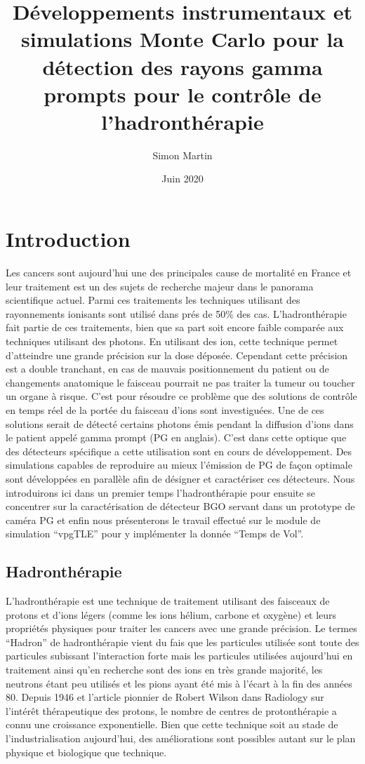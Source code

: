 \documentclass[11pt,a4paper,oldfontcommands]{memoir}
\begin{document}
\title{Développements instrumentaux et simulations Monte Carlo pour la détection des rayons gamma prompts pour le contrôle de l’hadronthérapie}
\author{Simon Martin}
\date{Juin 2020}



\maketitle
\newpage
\tableofcontents
\openany
\chapter{Introduction}
Les cancers sont aujourd'hui une des principales cause de mortalité en France et leur traitement est un des sujets de recherche majeur dans le panorama scientifique actuel. Parmi ces traitements les techniques utilisant des rayonnements ionisants sont utilisé dans prés de 50\% des cas. L'hadronthérapie fait partie de ces traitements, bien que sa part soit encore faible comparée aux techniques utilisant des photons. En utilisant des ion, cette technique permet d'atteindre une grande précision sur la dose déposée. Cependant cette précision est a double tranchant, en cas de mauvais positionnement du patient ou de changements anatomique le faisceau pourrait ne pas traiter la tumeur ou toucher un organe à risque. C'est pour résoudre ce problème que des solutions de contrôle en temps réel de la portée du faisceau d'ions sont investiguées. Une de ces solutions serait de détecté certains photons émis pendant la diffusion d'ions dans le patient appelé gamma prompt (PG en anglais). C'est dans cette optique que des détecteurs spécifique a cette utilisation sont en cours de développement. Des simulations capables de reproduire au mieux l'émission de PG de façon optimale sont développées en parallèle afin de désigner et caractériser ces détecteurs. Nous introduirons ici dans un premier temps l'hadronthérapie pour ensuite se concentrer sur la caractérisation de détecteur BGO servant dans un prototype de caméra PG et enfin nous présenterons le travail effectué sur le module de simulation \enquote{vpgTLE} pour y implémenter la donnée \enquote{Temps de Vol}. 
\openany
\section{Hadronthérapie}
L'hadronthérapie est une technique de traitement utilisant des faisceaux de protons et d'ions légers (comme les ions hélium, carbone et oxygène) et leurs propriétés physiques pour traiter les cancers avec une grande précision. Le termes \enquote{Hadron} de hadronthérapie vient du fais que les particules utilisée sont toute des particules subissant l'interaction forte mais les particules utilisées aujourd'hui en traitement ainsi qu'en recherche sont des ions en très grande majorité, les neutrons étant peu utilisés et les pions ayant été mis à l'écart à la fin des années 80. Depuis 1946 et l'article pionnier de Robert Wilson dans Radiology\cite{wilson} sur l'intérêt thérapeutique des protons, le nombre de centres de protonthérapie a connu une croissance exponentielle. Bien que cette technique soit au stade de l'industrialisation aujourd'hui, des améliorations sont possibles autant sur le plan physique et biologique que technique. 
\end{document}
